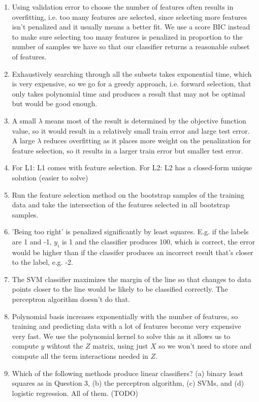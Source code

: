 \documentclass{article}
\def\enum#1{\begin{enumerate}#1\end{enumerate}}
\begin{document}
\enum{
\item Using validation error to choose the number of features often results in overfitting, i.e. too many features are selected, since selecting more features isn't penalized and it usually means a better fit. We use a score BIC instead to make sure selecting too many features is penalized in proportion to the number of samples we have so that our classifier returns a reasonable subset of features.
\item Exhaustively searching through all the subsets takes exponential time, which is very expensive, so we go for a greedy approach, i.e. forward selection, that only takes polynomial time and produces a result that may not be optimal but would be good enough.
\item A small $\lambda$ means most of the result is determined by the objective function value, so it would result in a relatively small train error and large test error. A large $\lambda$ reduces overfitting as it places more weight on the penalization for feature selection, so it results in a larger train error but smaller test error.
\item For L1: L1 comes with feature selection. For L2: L2 has a closed-form unique solution (easier to solve)
\item Run the feature selection method on the bootstrap samples of the training data and take the intersection of the features selected in all bootstrap samples.
\item 'Being too right' is penalized significantly by least squares. E.g. if the labels are 1 and -1, $y_i$ is 1 and the classifier produces 100, which is correct, the error would be higher than if the classifer produces an incorrect result that's closer to the label, e.g. -2.
\item The SVM classifier maximizes the margin of the line so that changes to data points closer to the line would be likely to be classified correctly. The perceptron algorithm doesn't do that.
\item Polynomial basis increases exponentially with the number of features, so training and predicting data with a lot of features become very expensive very fast. We use the polynomial kernel to solve this as it allows us to compute $y$ wihtout the $Z$ matrix, using just $X$ so we won't need to store and compute all the term interactions needed in $Z$.
\item Which of the following methods produce linear classifiers? (a) binary least squares as in Question 3, (b) the perceptron algorithm, (c) SVMs, and (d) logistic regression. All of them. (TODO)
}
\end{document}
